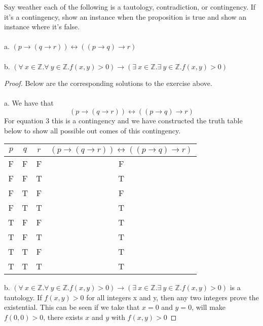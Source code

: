 \documentclass[12pt]{article}
\newenvironment{exercise}[2][Exercise]{\begin{trivlist}
\item[\hskip \labelsep {\bfseries #1}\hskip \labelsep {\bfseries #2.}]}{\end{trivlist}}
\begin{document}
\begin{exercise}{4} Say weather each of the following is a tautology, contradiction, or contingency. If it's a contingency, show an instance when the proposition is true and show an instance where it's false. \\ \\
a. $(p \rightarrow (q \rightarrow r)) \leftrightarrow ((p \rightarrow q) \rightarrow r)$ \\ \\
b. $(\forall\: x \in \mathbb{Z}. \forall\: y \in \mathbb{Z}.f(x,y) > 0) \rightarrow (\exists\: x \in \mathbb{Z}. \exists\: y \in \mathbb{Z}. f(x,y) > 0)$
\end{exercise}

\begin{proof}
Below are the corresponding solutions to the exercise above. \\ \\
a. We have that 
\begin{equation}
    (p \rightarrow (q \rightarrow r)) \leftrightarrow ((p \rightarrow q) \rightarrow r)
\end{equation}
For equation 3 this is a contingency and we have constructed the truth table below to show all possible out comes of this contingency.
\begin{center}
\begin{tabular}{ |c|c|c|c| } 
 \hline
 $p$ & $q$ & $r$ & $(p \rightarrow (q \rightarrow r)) \leftrightarrow ((p \rightarrow q) \rightarrow r)$\\ 
 \hline
 F & F & F & F \\ 
 \hline 
 F & F & T & T \\ 
 \hline
 F & T & F & F \\
 \hline 
 F & T & T & T \\ 
 \hline 
 T & F & F & T \\ 
 \hline 
 T & F & T & T \\ 
 \hline 
 T & T & F & T \\ 
 \hline 
 T & T & T & T \\ 
 \hline 
\end{tabular}
\end{center}
\bigskip 
b. $(\forall\: x \in \mathbb{Z}. \forall\: y \in \mathbb{Z}.f(x,y) > 0) \rightarrow (\exists\: x \in \mathbb{Z}. \exists\: y \in \mathbb{Z}. f(x,y) > 0)$ is a tautology. If $f(x,y) > 0 $ for all integers x and y, then any two integers prove the existential. This can be seen if we take that $x = 0$ and $y = 0$, will make $f(0,0) > 0$, there exists $x$ and $y$ with $f(x,y) > 0$

 \end{proof}
\end{document}
